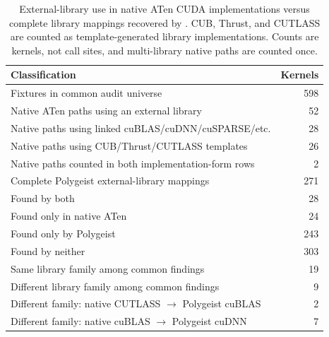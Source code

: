 \begin{table}[t]
  \centering
  \small
  \caption{External-library use in native ATen CUDA implementations versus complete library mappings recovered by \theproject{}. CUB, Thrust, and CUTLASS are counted as template-generated library implementations. Counts are kernels, not call sites, and multi-library native paths are counted once.}
  \label{tab:aten-library-overlap}
  \begin{tabular}{lr}
    \toprule
    Classification & Kernels \\
    \midrule
    Fixtures in common audit universe & 598 \\
    Native ATen paths using an external library & 52 \\
    Native paths using linked cuBLAS/cuDNN/cuSPARSE/etc. & 28 \\
    Native paths using CUB/Thrust/CUTLASS templates & 26 \\
    Native paths counted in both implementation-form rows & 2 \\
    Complete Polygeist external-library mappings & 271 \\
    Found by both & 28 \\
    Found only in native ATen & 24 \\
    Found only by Polygeist & 243 \\
    Found by neither & 303 \\
    Same library family among common findings & 19 \\
    Different library family among common findings & 9 \\
    Different family: native CUTLASS $\rightarrow$ Polygeist cuBLAS & 2 \\
    Different family: native cuBLAS $\rightarrow$ Polygeist cuDNN & 7 \\
    \bottomrule
  \end{tabular}
\end{table}
